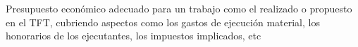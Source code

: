 Presupuesto económico adecuado para un trabajo como el realizado o propuesto en el TFT, cubriendo aspectos como los gastos de ejecución material, los honorarios de los ejecutantes, los impuestos implicados, etc

